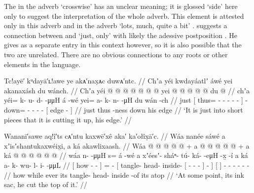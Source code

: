 The  in the adverb  ‘crosswise’ has an unclear meaning; it is glossed ‘side’ here only to suggest the interpretation of the whole adverb.
This  element is attested only in this adverb and in the adverb  ‘lots, much, quite a bit’ \parencite[08/217]{leer:1973}.
\citeauthor{leer:1978b} suggests a connection between  and  ‘just, only’ with  likely the adessive postposition \parencite[35]{leer:1978b}.
He gives  as a separate entry in this context however, so it is also possible that the two are unrelated.
There are no obvious connections to any roots or other elements in the language.

\ex\label{ex:91-212-short-bits-cut-edge}%
%
\begingl
	\glpreamble	Tc!ayē′ kᵘdayā′ʟ!awe ye akᴀ′nax̣ᴀc duwᴀ′ntc. //
	\glpreamble	Chʼa yéi kwdayáatlʼ áwé yei akanaxásh du wánch. //
	\gla	Chʼa {} yéi @  @ {} @ {} @ {} @ {} @ {} {}
		 @ {}
		yei @  @ {} @ {} @ {} @ {}
		{} du  @ {} {} //
	\glb	chʼa {} yéi= k- u- d-  -μμH {} {}
		á -wé
		yei= a- k- n-  -μH
		{} du wán -ch {} //
	\glc	just {}[ thus= - - -
			 - - {}]
		 -
		down= - - -  -
		{}[  edge - {}] //
	\gld	just {} thus  {} {} {} {} -ness {}
		 {}
		down  {} {} {} {}
		{} his edge {} {} //
	\glft	‘It is just into short pieces that it is cutting it up, his edge.’
		//
\endgl
\xe



\ex\label{ex:91-213-cut-ink-sac}%
%
\begingl
	\glpreamble	Wananī′sawe aq!î′ts cᴀ′ntu kaxwē′xê aka′ ka′ołîx̣ā′c. //
	\glpreamble	Wáa nanée sáwé a xʼisʼshantukaxwéix̱i, a ká akawlixaash. //
	\gla	{} Wáa  @ {} @ {} @ {} {}
		 @ {} @ {} +
		{} a  @ {} @ {} {} {} @ {} @ {} @ {} {} {} {} +
		{} a ká {}
		 @ {} @ {} @ {} @ {} @ {} @ {} //
	\glb	{} wáa n-  -μμH {} {} 
		s= á -wé
		{} a xʼéesʼ- sháⁿ- tú- {} ká-  -eμH -x̱ {} -í {}
		{} a ká {}
		a- k- wu- l- i-  -μμL //
	\glc	{}[ how -  - \· {}]
		=  -
		{}[  tangle- head- inside-
			{}[ -  - - {}]
			- {}]
		{}[   {}]
		- - - - -  - //
	\gld	{} how  {} {} \·while {}
		ever\·  {}
		{} its tangle- head- inside {}  {} {} {} {} -of {}
		{} its atop {}
		 {} {} {} {} {} {} //
	\glft	‘At some point, its ink sac, he cut the top of it.’
		//
\endgl
\xe

